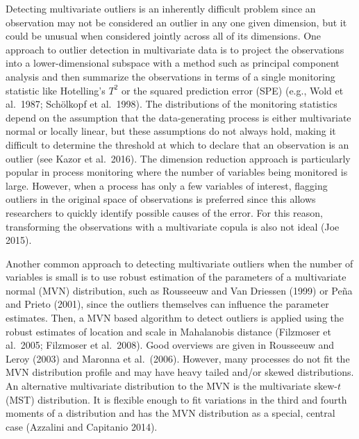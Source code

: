 \documentclass[12pt]{article}
\begin{document}
\begin{doublespacing}
Detecting multivariate outliers is an inherently difficult problem since an observation may not be considered an outlier in any one given dimension, but it could be unusual when considered jointly across all of its dimensions.   One approach to outlier detection in multivariate data is to project the observations into a lower-dimensional subspace with a method such as principal component analysis and then summarize the observations in terms of a single monitoring statistic like Hotelling's $T^2$ or the squared prediction error (SPE) (e.g., Wold et al.~1987; Sch\"{o}lkopf  et al.~1998). The distributions of the monitoring statistics depend on the assumption that the data-generating process is either multivariate normal or  locally linear, but these  assumptions do not always hold, making it difficult to determine the threshold at which to declare that an observation is an outlier  (see Kazor et al.~2016).  The dimension reduction approach is particularly popular in process monitoring where the number of variables being monitored is large.  However, when a process has only a few variables of interest,  flagging outliers in the original space of observations is preferred since this allows researchers to quickly identify possible causes of the error.  For this reason, transforming the observations with a multivariate copula is also not ideal (Joe 2015).


Another  common approach to detecting multivariate outliers when the number of variables is small is to use  robust estimation of the parameters of a multivariate normal (MVN) distribution, such as Rousseeuw and Van Driessen (1999) or Pe\~{n}a and Prieto (2001),  since the outliers themselves can influence the parameter estimates.  Then, a  MVN based  algorithm to detect outliers is  applied using the robust estimates of location and scale in  Mahalanobis distance (Filzmoser et al.~2005; Filzmoser et al.~2008).  Good overviews are given in Rousseeuw and Leroy (2003) and Maronna et al.~(2006).  However, many processes do not fit the MVN distribution profile and may have heavy tailed and/or skewed distributions.  An alternative multivariate distribution to the MVN is the  multivariate skew-$t$ (MST) distribution.  It is flexible enough to fit  variations in the third and fourth moments of a distribution and has the MVN distribution as a special, central case (Azzalini and Capitanio 2014).


 



\end{doublespacing}
\end{document}
